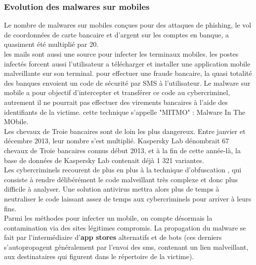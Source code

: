 \subsubsection{Evolution des malwares sur mobiles} 
Le nombre de malwares sur mobiles conçues pour des attaques de phishing, le vol de coordonnées de carte bancaire et d’argent sur les comptes en banque, a quasiment été multiplié par 20.\\

les mails sont aussi une source pour infecter les terminaux mobiles. les postes infectés forcent aussi l'utilisateur a télécharger et installer une application mobile malveillante sur son terminal. pour effectuer une fraude bancaire, la quasi totalité des banques envoient un code de sécurité par SMS à l'utilisateur. Le malware sur mobile a pour objectif d'intercepter et transférer ce code au cybercriminel, autrement il ne pourrait pas effectuer des virements bancaires à l'aide des identifiants de la victime. cette technique s'appelle "MITMO" : Malware In The MObile.\\


Les chevaux de Troie bancaires sont de loin les plus dangereux. Entre janvier et décembre 2013, leur nombre s’est multiplié. Kaspersky Lab dénombrait 67 chevaux de Troie bancaires connus début 2013, et à la fin de cette année-là, la base de données de Kaspersky Lab contenait déjà 1 321 variantes.\\


Les cybercriminels recourent de plus en plus à la technique d'obfuscation , qui consiste à rendre délibérément le code malveillant très complexe et donc plus difficile à analyser. Une solution antivirus mettra alors plus de temps à neutraliser le code laissant assez de temps aux cybercriminels pour arriver à leurs fins.\\


Parmi les méthodes pour infecter un mobile, on compte désormais la contamination via des sites légitimes compromis. La propagation du malware se fait par l'intermédiaire d’\textbf{app stores}  alternatifs et de bots (ces derniers s'autopropagent généralement par l'envoi des sms, contenant un lien malveillant, aux destinataires qui figurent dans le répertoire de la victime).\\

